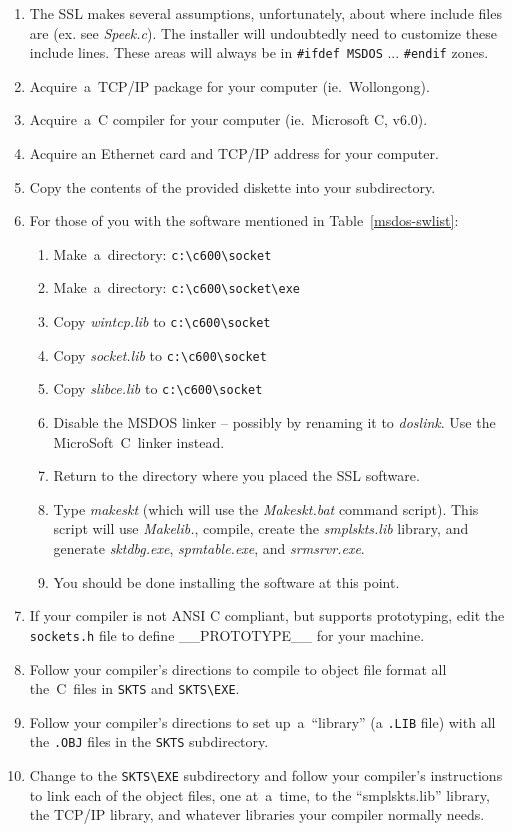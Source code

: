 \documentclass[12pt]{article}
\def\SSL{{\small SSL}}
\def\TCP{{\small TCP/IP }}
\begin{document}
\begin{enumerate}
  \item The {\SSL} makes several assumptions, unfortunately, about
        where include files are (ex. see {\em Speek.c\/}).  The installer
        will undoubtedly need to customize these include lines.  These
        areas will always be in \verb`#ifdef MSDOS` ... \verb`#endif` zones.
  \item Acquire~a~\TCP package for your computer (ie.~Wollongong).
  \item Acquire~a~C compiler for your computer (ie.~Microsoft C, v6.0).
  \item Acquire an Ethernet card and {\TCP} address for your computer.
  \item Copy the contents of the provided diskette into your subdirectory.
  \item For those of you with the software mentioned in
        Table~\ref{msdos-swlist}:
  \begin{enumerate}
    \item Make~a~directory: \verb`c:\c600\socket`
    \item Make~a~directory: \verb`c:\c600\socket\exe`
    \item Copy {\em wintcp.lib} to \verb`c:\c600\socket`
    \item Copy {\em socket.lib} to \verb`c:\c600\socket`
    \item Copy {\em slibce.lib} to \verb`c:\c600\socket`
    \item Disable the {\small MSDOS} linker -- possibly by renaming it
          to {\em doslink}.  Use the MicroSoft~C~linker instead.
    \item Return to the directory where you placed the {\SSL} software.
    \item Type {\em makeskt} (which will use the
        {\em Makeskt.bat} command script).  This script will use
        {\em Makelib.}, compile, create the {\em smplskts.lib} library,
        and generate {\em sktdbg.exe}, {\em spmtable.exe}, and
        {\em srmsrvr.exe}.
    \item You should be done installing the software at this point.
  \end{enumerate}
  \item If your compiler is not {\small ANSI C} compliant, but supports
        prototyping, edit the \verb`sockets.h` file to define {\small
        \_\_PROTOTYPE\_\_} for your machine.
  \item Follow your compiler's directions to compile to object file format
        all the~C~files in \verb`SKTS` and \verb`SKTS\EXE`.
  \item Follow your compiler's directions to set up~a~``library'' (a {\tt .LIB}
        file) with all the {\tt .OBJ} files in the \verb`SKTS` subdirectory.
  \item Change to the \verb`SKTS\EXE` subdirectory and follow your compiler's
        instructions to link each of the object files, one at~a~time, to the
        ``smplskts.lib'' library, the {\TCP} library, and whatever
        libraries your compiler normally needs.

\end{enumerate}
\end{document}
